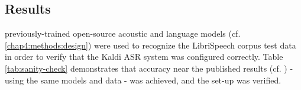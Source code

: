 





\subsection{Results}
\label{chap4:results}

\DIFdelbegin {}\DIFdelend \DIFaddbegin {}\DIFaddend previously-trained open-source acoustic and language models (cf. \DIFaddbegin {}\DIFaddend \ref{chap4:methods:design}) were used to recognize the LibriSpeech corpus test data in order to verify that the Kaldi ASR system was configured correctly.  Table \ref{tab:sanity-check} demonstrates that accuracy near the published results (cf. \cite{panayotov:15}) - using the same models and data - was achieved, and the \DIFdelbegin {}\DIFdelend \DIFaddbegin {}\DIFaddend set-up was verified.

